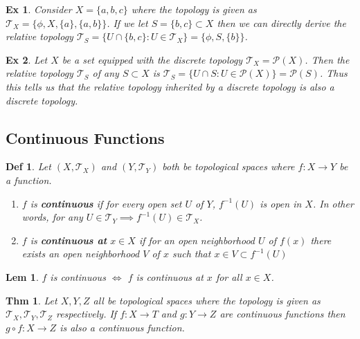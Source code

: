 \documentclass[paper=a4, fontsize=11pt]{scrartcl}
\newcommand{\T}{\mathcal{T}}
\newtheorem{theorem}{Thm}
\newtheorem{definition}{Def}
\newtheorem{example}{Ex}
\newtheorem{lemma}{Lem}
\begin{document}
\vspace{0.15in}

\begin{example}
Consider $X=\{ a,b,c \}$ where the topology is given as $\T_X = \{ \phi, X, \{a\}, \{a,b\} \}$. If we let $S=\{b,c\} \subset X$ then we can directly derive the relative topology $\T_S = \{ U \cap \{b,c\} : U\in \T_X \}= \{ \phi, S , \{b\} \}$.
\end{example}

\vspace{0.15in}

\begin{example}
	Let $X$ be a set equipped with the discrete topology $\T_X=\mathcal{P}(X)$. Then the relative topology $\T_S$ of any $S\subset X$ is $\T_S =\{ U \cap S : U\in \mathcal{P}(X) \} = \mathcal{P}(S)$. Thus this tells us that the relative topology inherited by a discrete topology is also a discrete topology.
\end{example}

\vspace{0.15in}
\subsection{Continuous Functions}
\vspace{0.1in}

\begin{definition}
	Let $(X,\T_X)$ and $(Y,\T_Y)$ both be topological spaces where $f:X\to Y$ be a function. 
	\begin{enumerate}[label=\arabic*)]
		\item $f$ is \textbf{continuous} if for every open set $U$ of $Y$, $f^{-1}(U)$ is open in $X$. In other words, for any $U\in \T_Y \implies f^{-1}(U)\in \T_X$.
		\item $f$ is \textbf{continuous at} $x\in X$ if for an open neighborhood  $U$ of $f(x)$ there exists an open neighborhood $V$ of $x$ such that $x\in V \subset f^{-1}(U)$
	\end{enumerate}
\end{definition}

\vspace{0.15in}

\begin{lemma}
	$f$ is continuous $\iff$ $f$ is continuous at $x$ for all $x\in X$.
\end{lemma}

\vspace{0.15in}

\begin{theorem}
Let $X,Y,Z$ all be topological spaces where the topology is given as $\T_X,\T_Y,\T_Z$ respectively. If $f:X\to T$ and $g: Y\to Z$ are continuous functions then $g\circ f : X \to Z$ is also a continuous function.\\
\end{theorem}
\end{document}
